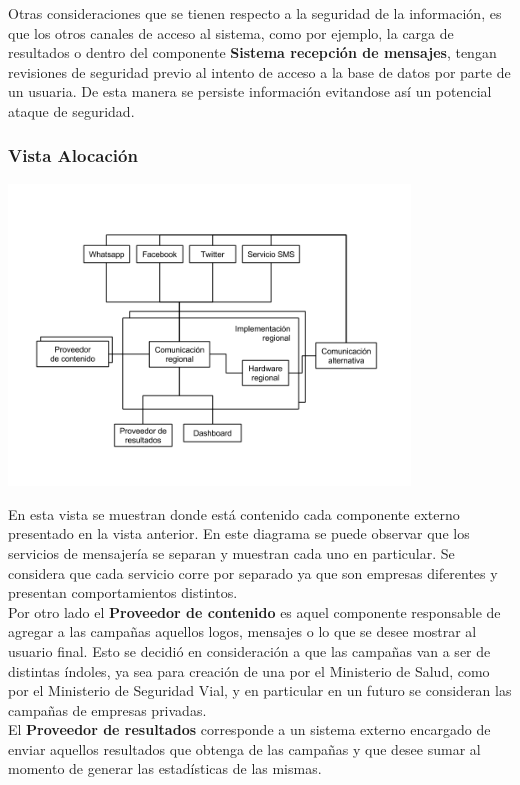 \documentclass[a4paper, 11pt]{article}
\begin{document}
Otras consideraciones que se tienen respecto a la seguridad de la información, es que los otros canales de acceso al sistema, como por ejemplo, la carga de resultados o dentro del componente \textbf{Sistema recepción de mensajes}, tengan revisiones de seguridad previo al intento de acceso a la base de datos por parte de un usuaria. De esta manera se persiste información evitandose así un potencial ataque de seguridad.\\

\newpage
\subsubsection{Vista Alocación}

\centerline{\includegraphics[width=0.8\textwidth]{./diagramas/VistaAlocacion.png}}

En esta vista se muestran donde está contenido cada componente externo presentado en la vista anterior. En este diagrama se puede observar que los servicios de mensajería se separan y muestran cada uno en particular. Se considera que cada servicio corre por separado ya que son empresas diferentes y presentan comportamientos distintos.\\

Por otro lado el \textbf{Proveedor de contenido} es aquel componente responsable de agregar a las campañas aquellos logos, mensajes o lo que se desee mostrar al usuario final. Esto se decidió en consideración a que las campañas van a ser de distintas índoles, ya sea para creación de una por el Ministerio de Salud, como por el Ministerio de Seguridad Vial, y en particular en un futuro se consideran las campañas de empresas privadas.\\

El \textbf{Proveedor de resultados} corresponde a un sistema externo encargado de enviar aquellos resultados que obtenga de las campañas y que desee sumar al momento de generar las estadísticas de las mismas. \\
\end{document}
